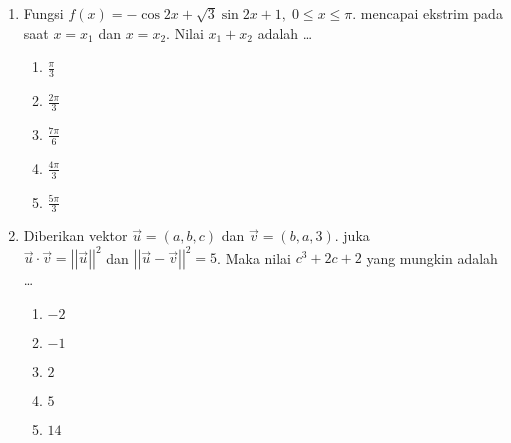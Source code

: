 \documentclass[A4,12PT, english, twocolumn]{journal}
\begin{document}
\begin{enumerate}
\item Fungsi $f \left(x \right) = - \cos{2x} + \sqrt{3}\sin{2x} + 1, \; 0 \leq x \leq \pi$. mencapai ekstrim pada saat $x=x_1$ dan $x=x_2$. Nilai $x_1+x_2$ adalah \dots
    \begin{enumerate}
        \item $\frac{\pi}{3}$
        \item $\frac{2\pi}{3}$
        \item $\frac{7\pi}{6}$
        \item $\frac{4\pi}{3}$
        \item $\frac{5\pi}{3}$
    \end{enumerate}
    
\item Diberikan vektor $\Vec{u} = \left(a,b,c \right)$ dan $
\Vec{v} = \left(b,a,3 \right)$. juka \\ $\Vec{u} \cdot \Vec{v} = \left| {\left| \Vec{u} \right|} \right|^2$ dan $\left| {\left| \Vec{u} - \Vec{v} \right|} \right|^2 = 5$. Maka nilai $c^3+2c+2$ yang mungkin adalah \dots
    \begin{enumerate}
        \item $-2$
        \item $-1$
        \item $2$
        \item $5$
        \item $14$
    \end{enumerate}


\end{enumerate}
\end{document}
